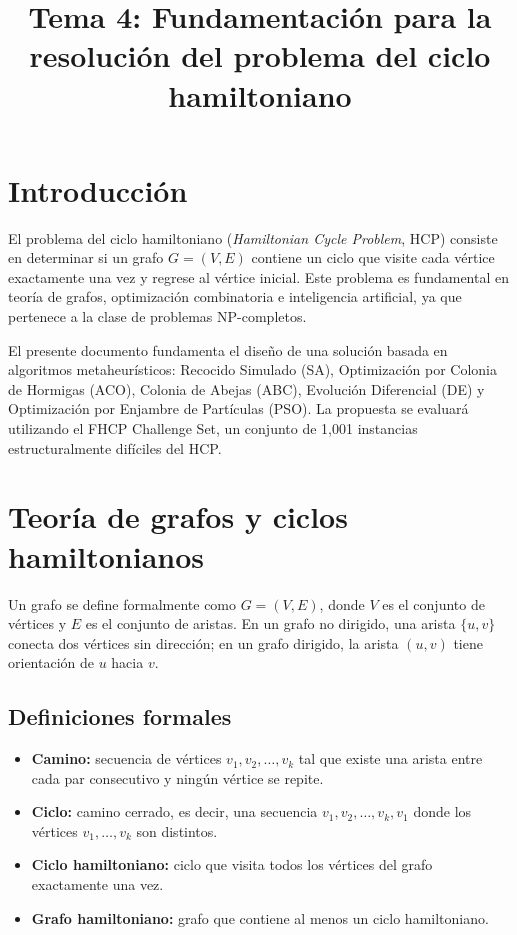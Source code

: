 \documentclass[12pt]{article}
\title{Tema 4: Fundamentación para la resolución del problema del ciclo hamiltoniano}
\author{}
\date{}
\begin{document}
\maketitle

\section{Introducción}

El problema del ciclo hamiltoniano (\textit{Hamiltonian Cycle Problem}, HCP) consiste en determinar si un grafo \(G=(V,E)\) contiene un ciclo que visite cada vértice exactamente una vez y regrese al vértice inicial. Este problema es fundamental en teoría de grafos, optimización combinatoria e inteligencia artificial, ya que pertenece a la clase de problemas NP-completos. \cite{fhcp}

El presente documento fundamenta el diseño de una solución basada en algoritmos metaheurísticos: Recocido Simulado (SA), Optimización por Colonia de Hormigas (ACO), Colonia de Abejas (ABC), Evolución Diferencial (DE) y Optimización por Enjambre de Partículas (PSO). La propuesta se evaluará utilizando el FHCP Challenge Set, un conjunto de 1{,}001 instancias estructuralmente difíciles del HCP. \cite{fhcpset}

\section{Teoría de grafos y ciclos hamiltonianos}

Un grafo se define formalmente como \(G=(V,E)\), donde \(V\) es el conjunto de vértices y \(E\) es el conjunto de aristas. En un grafo no dirigido, una arista \(\{u,v\}\) conecta dos vértices sin dirección; en un grafo dirigido, la arista \((u,v)\) tiene orientación de \(u\) hacia \(v\). \cite{west}

\subsection{Definiciones formales}

\begin{itemize}
    \item \textbf{Camino:} secuencia de vértices \(v_1,v_2,\dots,v_k\) tal que existe una arista entre cada par consecutivo y ningún vértice se repite.
    \item \textbf{Ciclo:} camino cerrado, es decir, una secuencia \(v_1,v_2,\dots,v_k,v_1\) donde los vértices \(v_1,\dots,v_k\) son distintos.
    \item \textbf{Ciclo hamiltoniano:} ciclo que visita todos los vértices del grafo exactamente una vez.
    \item \textbf{Grafo hamiltoniano:} grafo que contiene al menos un ciclo hamiltoniano.
\end{itemize}
\end{document}
